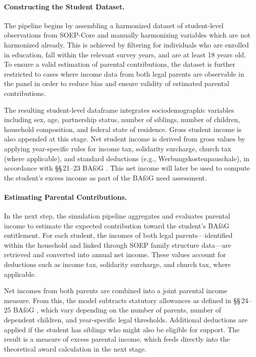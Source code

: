 \paragraph{Constructing the Student Dataset.}
The pipeline begins by assembling a harmonized dataset of student-level observations from SOEP-Core and manually harmonizing variables which are not harmonized already.
This is achieved by filtering for individuals who are enrolled in education, fall within the relevant survey years, and are at least 18 years old. 
To ensure a valid estimation of parental contributions, the dataset is further restricted to cases where income data from both legal parents are observable in the panel in order to reduce bias and ensure validity of estimated parental contributions.

The resulting student-level dataframe integrates sociodemographic variables including sex, age, partnership status, number of siblings, number of children, household composition, and federal state of residence. 
Gross student income is also appended at this stage. 
Net student income is derived from gross values by applying year-specific rules for income tax, solidarity surcharge, church tax (where applicable), and standard deductions (e.g., Werbungskostenpauschale), in accordance with §§\,21–23 BAföG \citep{bafoeg_law}.
This net income will later be used to compute the student’s excess income as part of the BAföG need assessment.


\paragraph{Estimating Parental Contributions.}
In the next step, the simulation pipeline aggregates and evaluates parental income to estimate the expected contribution toward the student’s BAföG entitlement. 
For each student, the incomes of both legal parents—identified within the household and linked through SOEP family structure data—are retrieved and converted into annual net income. 
These values account for deductions such as income tax, solidarity surcharge, and church tax, where applicable.

Net incomes from both parents are combined into a joint parental income measure. 
From this, the model subtracts statutory allowances as defined in §§\,24–25 BAföG \citep{bafoeg_law}, which vary depending on the number of parents, number of dependent children, and year-specific legal thresholds. 
Additional deductions are applied if the student has siblings who might also be eligible for support. 
The result is a measure of excess parental income, which feeds directly into the theoretical award calculation in the next stage.

